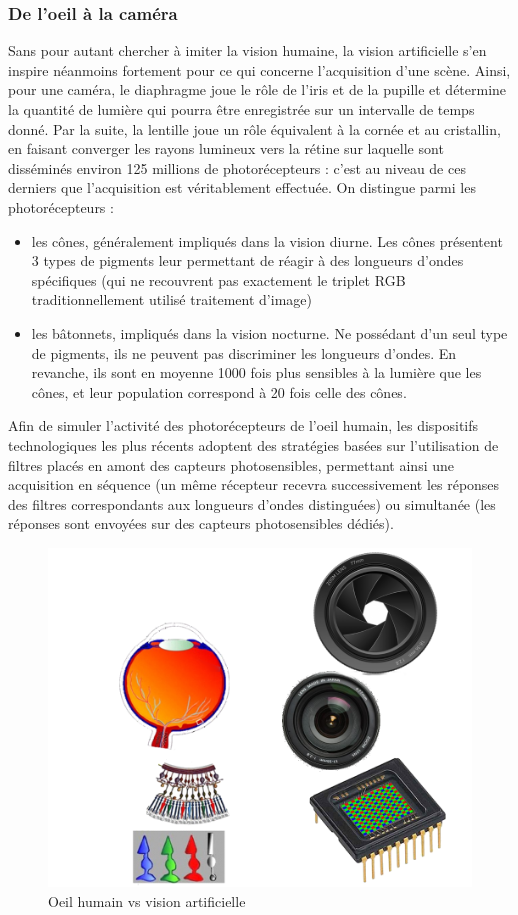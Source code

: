  \subsubsection{De l'oeil à la caméra}
 
 Sans pour autant chercher à imiter la vision humaine, la vision artificielle s'en inspire néanmoins fortement pour ce qui concerne l'acquisition d'une scène. Ainsi, pour une caméra, le diaphragme joue le rôle de l'iris et de la pupille et détermine la quantité de lumière qui pourra être enregistrée sur un intervalle de temps donné. Par la suite, la lentille joue un rôle équivalent à la cornée et au cristallin, en faisant converger les rayons lumineux vers la rétine sur laquelle sont disséminés environ 125 millions de photorécepteurs : c'est au niveau de ces derniers que l'acquisition est véritablement effectuée. On distingue parmi les photorécepteurs :
 \begin{itemize}
  \item les cônes, généralement impliqués dans la vision diurne. Les cônes présentent 3 types de pigments leur permettant de réagir à des longueurs d'ondes spécifiques (qui ne recouvrent pas exactement le triplet RGB traditionnellement utilisé traitement d'image)
  \item les bâtonnets, impliqués dans la vision nocturne. Ne possédant d'un seul type de pigments, ils ne peuvent pas discriminer les longueurs d'ondes. En revanche, ils sont en moyenne 1000 fois plus sensibles à la lumière que les cônes, et leur population correspond à 20 fois celle des cônes.
 \end{itemize}

 Afin de simuler l'activité des photorécepteurs de l'oeil humain, les dispositifs technologiques les plus récents adoptent des stratégies basées sur l'utilisation de filtres placés en amont des capteurs photosensibles, permettant ainsi une acquisition en séquence (un même récepteur recevra successivement les réponses des filtres correspondants aux longueurs d'ondes distinguées) ou simultanée (les réponses sont envoyées sur des capteurs photosensibles dédiés).
  
\begin{figure}[htp]
  \centering
  \includegraphics[width=.85\linewidth]{./intro/figures/oeil.png}
    \caption{\footnotesize{Oeil humain vs vision artificielle}}
\label{intro:fig11}
\end{figure}
 
